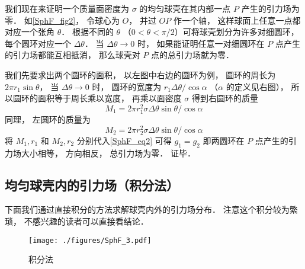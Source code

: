 我们现在来证明一个质量面密度为 $\sigma$ 的均匀球壳在其内部一点 $P$ 产生的引力场为零． 如\autoref{SphF_fig2}， 令球心为 $O$， 并过 $OP$ 作一个轴， 这样球面上任意一点都对应一个张角 $\theta$． 根据不同的 $\theta$ （$0 < \theta < \pi/2$）可将球壳划分为许多对细圆环， 每个圆环对应一个 $\Delta\theta$． 当 $\Delta\theta\to 0$ 时， 如果能证明任意一对细圆环在 $P$ 点产生的引力场都能互相抵消， 那么球壳对 $P$ 点的总引力场就为零．

我们先要求出两个圆环的面积， 以左图中右边的圆环为例， 圆环的周长为 $2\pi r_1\sin\theta$， 当 $\Delta\theta\to 0$ 时， 圆环的宽度为 $r_1\Delta\theta/\cos\alpha$ （$\alpha$ 的定义见右图）， 所以圆环的面积等于周长乘以宽度， 再乘以面密度 $\sigma$ 得到右圆环的质量
\begin{equation}
M_1 = 2\pi r_1^2 \sigma \Delta\theta\sin\theta /\cos\alpha
\end{equation}
同理， 左圆环的质量为
\begin{equation}
M_2 = 2\pi r_2^2 \sigma \Delta\theta\sin\theta /\cos\alpha
\end{equation}
将 $M_1, r_1$ 和 $M_2, r_2$ 分别代入\autoref{SphF_eq2} 可得 $g_1 = g_2$ 即两圆环在 $P$ 点产生的引力场大小相等， 方向相反， 总引力场为零． 证毕．

\subsection{均匀球壳内的引力场（积分法）}
下面我们通过直接积分的方法求解球壳内外的引力场分布． 注意这个积分较为繁琐， 不感兴趣的读者可以直接看结论．

\begin{figure}[ht]
\centering
\texttt{[image: ./figures/SphF\_3.pdf]}
\caption{积分法} \label{SphF_fig3}
\end{figure}

